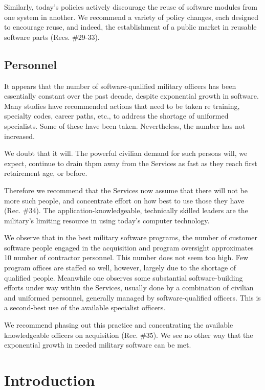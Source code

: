 \documentclass[12pt]{article}
\begin{document}
Similarly, today's policies actively discourage the reuse of software modules from
one system in another. We recommend a variety of policy changes, each designed to
encourage reuse, and indeed, the establishment of a public market in reusable software
parts (Recs. \#29-33).

\subsection*{Personnel}

It appears that the number of software-qualified military officers has been
essentially constant over the past decade, despite exponential growth in
software. Many studies have recommended actions that need to be taken re
training, specialty codes, career paths, etc., to address the shortage of
uniformed specialists. Some of these have been taken.  Nevertheless, the
number has not increased.

We doubt that it will. The powerful civilian demand for such persoas will, we expect,
continue to drain thpm away from the Services as fast as they reach first retairement age,
or before. %

Therefore we recommend that the Services now assume that there will not be more
such people, and concentrate effort on how best to use those they have (Rec. \#34). The
application-knowledgeable, technically skilled leaders are the military's limiting resource
in using today's computer technology.

We observe that in the best military software programs, the number of customer
software people engaged in the acquisition and program oversight approximates 10%
number of contractor personnel. This number does not seem too high. Few program offices
are staffed so well, however, largely due to the shortage of qualified people. Meanwhile
one observes some substantial software-building efforts under way within the Services,
usually done by a combination of civilian and uniformed personnel, generally managed by
software-qualified officers. This is a second-best use of the available specialist officers.

We recommend phasing out this practice and concentrating the available knowledgeable
officers on acquisition (Rec. \#35). We see no other way that the exponential growth in
needed military software can be met.

\section{Introduction}
\end{document}
